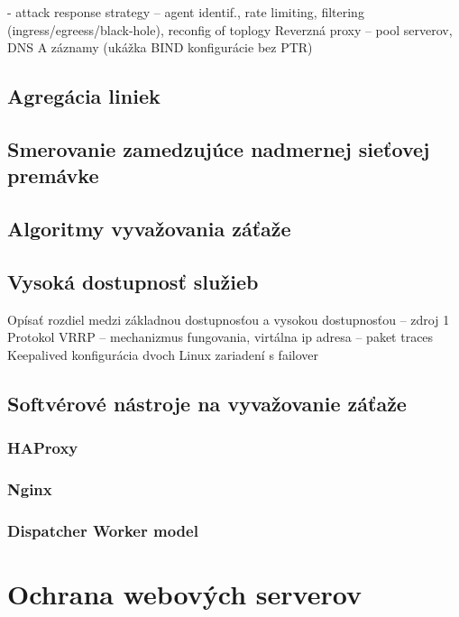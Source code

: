 \documentclass[12pt, a4paper]{article}
\begin{document}
- attack response strategy – agent identif., rate limiting, filtering (ingress/egreess/black-hole), reconfig of toplogy
Reverzná proxy – pool serverov, DNS A záznamy (ukážka BIND konfigurácie bez PTR)

\subsection{Agregácia liniek}

\subsection{Smerovanie zamedzujúce nadmernej sieťovej premávke}

\subsection{Algoritmy vyvažovania záťaže}

\subsection{Vysoká dostupnosť služieb}
Opísať rozdiel medzi základnou dostupnosťou a vysokou dostupnosťou – zdroj 1
Protokol VRRP – mechanizmus fungovania, virtálna ip adresa – paket traces
Keepalived konfigurácia dvoch Linux zariadení s failover

\subsection{Softvérové nástroje na vyvažovanie záťaže}

\subsubsection{HAProxy}

\subsubsection{Nginx}

\subsubsection{Dispatcher Worker model}


\section{Ochrana webových serverov}
\end{document}
